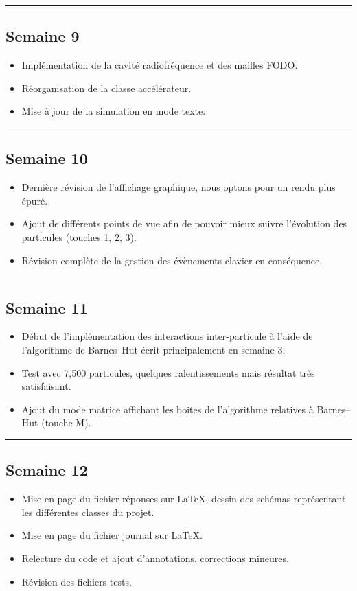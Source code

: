 \documentclass[12pt, letterpaper, twoside]{article}
\begin{document}
\rule{\textwidth}{0.4pt}

\subsection*{Semaine 9}
\begin{itemize}
\item Implémentation de la cavité radiofréquence et des mailles FODO.
\item Réorganisation de la classe accélérateur.
\item Mise à jour de la simulation en mode texte.
\end{itemize}

\rule{\textwidth}{0.4pt}

\subsection*{Semaine 10}
\begin{itemize}
\item Dernière révision de l’affichage graphique, nous optons pour un rendu plus épuré.
\item Ajout de différents points de vue afin de pouvoir mieux suivre l’évolution des particules (touches 1, 2, 3).
\item Révision complète de la gestion des évènements clavier en conséquence.
\end{itemize}

\rule{\textwidth}{0.4pt}

\subsection*{Semaine 11}
\begin{itemize}
	\item Début de l’implémentation des interactions inter-particule à l’aide de l’algorithme de Barnes--Hut écrit principalement en semaine 3.
\item Test avec 7,500 particules, quelques ralentissements mais résultat très satisfaisant.
\item Ajout du mode matrice affichant les boites de l’algorithme relatives à Barnes--Hut (touche M).
\end{itemize}

\rule{\textwidth}{0.4pt}

\subsection*{Semaine 12}
\begin{itemize}
\item Mise en page du fichier réponses sur \LaTeX, dessin des schémas représentant les différentes classes du projet.
\item Mise en page du fichier journal sur \LaTeX.
\item Relecture du code et ajout d’annotations, corrections mineures.
\item Révision des fichiers tests.
\end{itemize}
\end{document}
